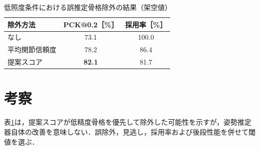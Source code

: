 \begin{table}[tb]
  \centering
  \caption{低照度条件における誤推定骨格除外の結果（架空値）}
  \label{tab:experiment-results}
  \begin{tabularx}{0.82\textwidth}{@{}Xcc@{}}
    \toprule
    除外方法 & PCK@0.2［\%］ & 採用率［\%］ \\
    \midrule
    なし & 73.1 & 100.0 \\
    平均関節信頼度 & 78.2 & 86.4 \\
    提案スコア & \textbf{82.1} & 81.7 \\
    \bottomrule
  \end{tabularx}
\end{table}

\section{考察}

表\ref{tab:experiment-results}は，提案スコアが低精度骨格を優先して除外した可能性を示すが，姿勢推定器自体の改善を意味しない．誤除外，見逃し，採用率および後段性能を併せて閾値を選ぶ．
